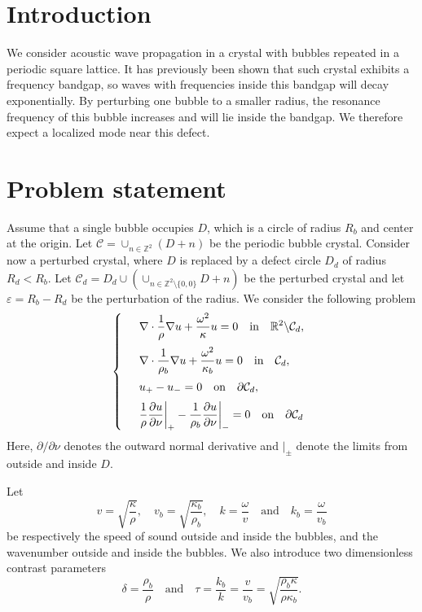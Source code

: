 \documentclass[a4paper]{article}
\author{Erik Orvehed Hiltunen}
\theoremstyle{definition}
\newcommand{\Z}{\mathbb{Z}}
\newcommand{\R}{\mathbb{R}}
\newcommand{\C}{\mathcal{C}}
\renewcommand{\epsilon}{\varepsilon}
\newcommand{\ds}{\displaystyle}
\def\nm{\noalign{\medskip}}
\begin{document}
\section{Introduction}
We consider acoustic wave propagation in a crystal with bubbles repeated in a periodic square lattice. It has previously been shown that such crystal exhibits a frequency bandgap, so waves with frequencies inside this bandgap will decay exponentially. By perturbing one bubble to a smaller radius, the resonance frequency of this bubble increases and will lie inside the bandgap. We therefore expect a localized mode near this defect.


\section{Problem statement}
Assume that a single bubble occupies $D$, which is a circle of radius $R_b$ and center at the origin. Let $\C = \cup_{n\in\Z^2}(D+n)$ be the periodic bubble crystal. Consider now a perturbed crystal, where $D$ is replaced by a defect circle $D_d$ of radius $R_d < R_b$. Let $\C_d = D_d \cup \left( \cup_{n\in\Z^2\setminus\{0,0\}} D+n \right)$ be the perturbed crystal and let $\epsilon = R_b-R_d$ be the perturbation of the radius. We consider the following problem
\begin{equation} \label{eq:scattering}
\left\{
\begin{array} {ll}
	&\ds \nabla \cdot \frac{1}{\rho} \nabla  u+ \frac{\omega^2}{\kappa} u  = 0 \quad \text{in} \quad \R^2 \backslash \C_d, \\
	\nm
	&\ds \nabla \cdot \frac{1}{\rho_b} \nabla  u+ \frac{\omega^2}{\kappa_b} u  = 0 \quad \text{in} \quad \C_d, \\
	\nm
	&\ds  u_{+} -u_{-}  =0   \quad \text{on} \quad \partial \C_d, \\
	\nm
	& \ds  \frac{1}{\rho} \frac{\partial u}{\partial \nu} \bigg|_{+} - \frac{1}{\rho_b} \frac{\partial u}{\partial \nu} \bigg|_{-} =0 \quad \text{on} \quad \partial \C_d
\end{array}
\right.
\end{equation}
Here, $\partial/\partial \nu$ denotes the outward normal derivative and $|_\pm$ denote the limits from outside and inside $D$.  

Let
\begin{equation*} %
v = \sqrt{\frac{\kappa}{\rho}}, \quad v_b = \sqrt{\frac{\kappa_b}{\rho_b}}, \quad k= \frac{\omega}{v} \quad \text{and} \quad k_b= \frac{\omega}{v_b}
\end{equation*}
be respectively the speed of sound outside and inside the bubbles, and the wavenumber outside and inside the bubbles. We also introduce two dimensionless contrast parameters
\begin{equation*} %
\delta = \frac{\rho_b}{\rho} \quad \text{and} \quad \tau= \frac{k_b}{k}= \frac{v}{v_b} =\sqrt{\frac{\rho_b \kappa}{\rho \kappa_b}}. 
\end{equation*}
\end{document}
